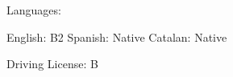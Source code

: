 \documentclass[]{awesome-cv}
\begin{document}
\vspace{2mm}
\begin{cventries}
	\vspace{2mm}
	\cventry
	{Languages:}
	{}
	{}
	{}
	{\begin{cvsectionnormaltext} 
		\item{English: B2 \newline \vspace{2mm} Spanish: Native \newline \vspace{2mm} Catalan: Native}
	\end{cvsectionnormaltext}}
 
	\cventry
	{Driving License: B}
	{}
	{}
	{}
    {}

\end{cventries}
\end{document}
